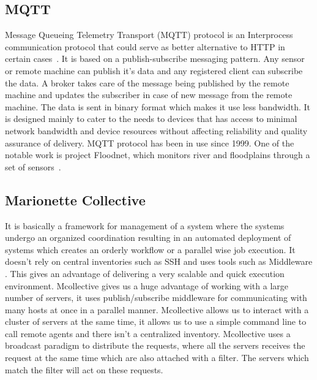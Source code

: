 \pv 

\subsection{MQTT}
     
Message Queueing Telemetry Transport (MQTT) protocol is an
Interprocess communication protocol that could serve as better
alternative to HTTP in certain cases~\cite{www-mqtt}. It is based on a
publish-subscribe messaging pattern. Any sensor or remote machine can
publish it's data and any registered client can subscribe the data. A
broker takes care of the message being published by the remote machine
and updates the subscriber in case of new message from the remote
machine. The data is sent in binary format which makes it use less
bandwidth. It is designed mainly to cater to the needs to devices that
has access to minimal network bandwidth and device resources without
affecting reliability and quality assurance of delivery. MQTT protocol
has been in use since 1999. One of the notable work is project
Floodnet, which monitors river and floodplains through a set of
sensors~\cite{www-floodnet}.

     \pv

\subsection{Marionette Collective}

It is basically a framework for management of a system where the
systems undergo an organized coordination resulting in an automated
deployment of systems which creates an orderly workflow or a parallel
wise job execution. It doesn’t rely on central inventories such as SSH
and uses tools such as Middleware \cite{www-marionette-webpage}. This
gives an advantage of delivering a very scalable and quick execution
environment.  Mcollective gives us a huge advantage of working with a
large number of servers, it uses publish/subscribe middleware for
communicating with many hosts at once in a parallel
manner. Mcollective allows us to interact with a cluster of servers at
the same time, it allows us to use a simple command line to call
remote agents and there isn’t a centralized inventory. Mcollective
uses a broadcast paradigm to distribute the requests, where all the
servers receives the request at the same time which are also attached
with a filter. The servers which match the filter will act on these
requests.

     \pv
     
